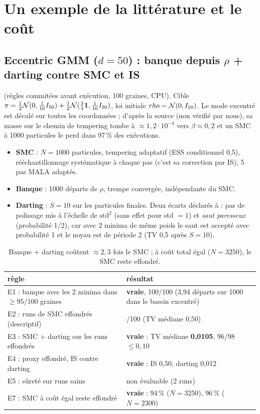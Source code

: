 \section{Un exemple de la littérature et le coût}
\label{sec:eccentric}

\subsection{Eccentric GMM ($d=50$) : banque depuis $\rho$ + darting contre SMC et IS}
 (règles commitées avant exécution, 100 graines, CPU). Cible $\pi=\tfrac12\mathcal{N}(0,\tfrac1{16}I_{50})+\tfrac12\mathcal{N}(\tfrac34\mathbf 1,\tfrac1{16}I_{50})$, loi initiale $rho=\mathcal{N}(0,I_{50})$. Le mode excentré est décalé sur toutes les coordonnées ; d'après la source (non vérifié par nous), sa masse sur le chemin de tempering tombe à $\approx1{,}2\cdot10^{-4}$ vers $\beta\approx0{,}2$ et un SMC à 1000 particules le perd dans 97\,\% des exécutions.
\begin{itemize}
  \item \textbf{SMC} : $N=1000$ particules, tempering adaptatif (ESS conditionnel 0,5), rééchantillonnage systématique à chaque pas (c'est sa correction par IS), 5 pas MALA adaptés.
  \item \textbf{Banque} : 1000 départs de $\rho$, trempe convergée, indépendante du SMC.
  \item \textbf{Darting} : $S=10$ sur les particules finales. Deux écarts déclarés à  : pas de polissage mis à l'échelle de $\mathrm{std}^2$ (sans effet pour std $=1$) et \emph{saut paresseux} (probabilité 1/2), car avec 2 minima de même poids le saut est accepté avec probabilité 1 et le noyau est de période 2 (TV 0,5 après $S=10$).
\end{itemize}
\begin{table}[h]\centering\small
\begin{tabularx}{\linewidth}{>{\raggedright\arraybackslash}p{6.3cm}>{\raggedright\arraybackslash}X}\toprule
règle & résultat\\\midrule
E1 : banque avec les 2 minima dans $\ge95/100$ graines & \textbf{vraie}, 100/100 (3,94 départs sur 1000 dans le bassin excentré)\\
E2 : runs de SMC effondrés (descriptif) & 98/100 (TV médiane 0,50)\\
E3 : SMC + darting sur les runs effondrés & \textbf{vraie} : TV médiane \textbf{0,0105}, 96/98 $\le0{,}10$\\
E4 : proxy effondré, IS contre darting & \textbf{vraie} : IS 0,50, darting 0,012\\
E5 : sûreté sur runs sains & non évaluable (2 runs)\\
E7 : SMC à coût égal reste effondré & \textbf{vraie} : 94\,\% ($N=3250$), 96\,\% ($N=2300$)\\\bottomrule
\end{tabularx}
\caption{Banque + darting coûtent $\approx2{,}3$ fois le SMC ; à coût total égal ($N=3250$), le SMC reste effondré.}
\end{table}

